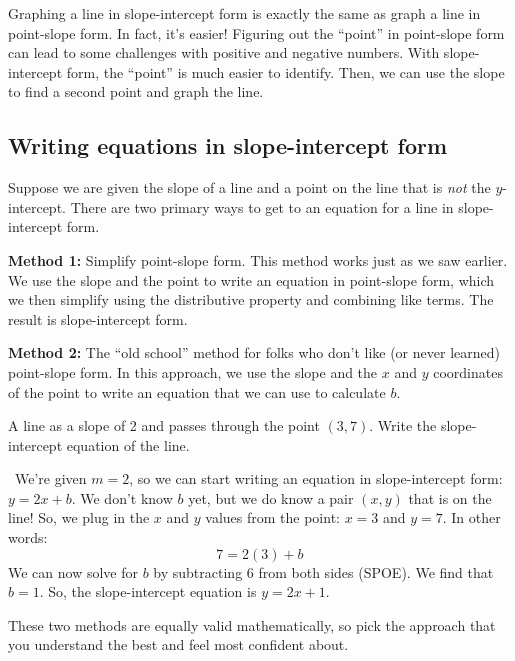 Graphing a line in slope-intercept form is exactly the same as graph a line in point-slope form. In fact, it's easier! Figuring out the ``point'' in point-slope form can lead to some challenges with positive and negative numbers. With slope-intercept form, the ``point'' is much easier to identify. Then, we can use the slope to find a second point and graph the line.

\subsection{Writing equations in slope-intercept form}

Suppose we are given the slope of a line and a point on the line that is \textit{not} the $y$-intercept. There are two primary ways to get to an equation for a line in slope-intercept form.

\textbf{Method 1:} Simplify point-slope form. This method works just as we saw earlier. We use the slope and the point to write an equation in point-slope form, which we then simplify using the distributive property and combining like terms. The result is slope-intercept form.

\textbf{Method 2:} The ``old school'' method for folks who don't like (or never learned) point-slope form. In this approach, we use the slope and the $x$ and $y$ coordinates of the point to write an equation that we can use to calculate $b$.

\begin{boxex}
A line as a slope of 2 and passes through the point $(3, 7)$. Write the slope-intercept equation of the line.

\exsoln\ We're given $m=2$, so we can start writing an equation in slope-intercept form: $y=2x+b$. We don't know $b$ yet, but we do know a pair $(x,y)$ that is on the line! So, we plug in the $x$ and $y$ values from the point: $x=3$ and $y=7$. In other words: \[7=2(3) + b\]
We can now solve for $b$ by subtracting 6 from both sides (SPOE). We find that $b=1$. So, the slope-intercept equation is $y = 2x + 1$.
\end{boxex}

These two methods are equally valid mathematically, so pick the approach that you understand the best and feel most confident about.

